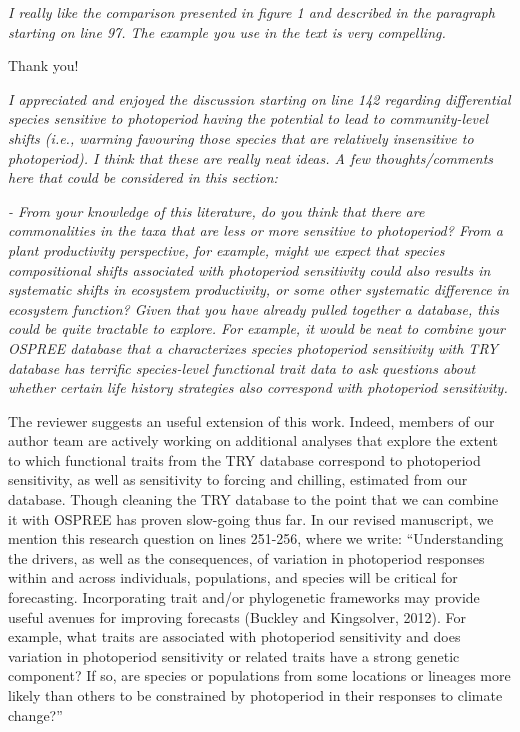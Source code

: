\documentclass{article}
\begin{document}
\par \emph{I really like the comparison presented in figure 1 and described in the paragraph starting on line 97. The example you use in the text is very compelling. }
\par Thank you!
\par \emph{I appreciated and enjoyed the discussion starting on line 142 regarding differential species sensitive to photoperiod having the potential to lead to community-level shifts (i.e., warming favouring those species that are relatively insensitive to photoperiod). I think that these are really neat ideas. A few thoughts/comments here that could be considered in this section: }
\par \emph{- From your knowledge of this literature, do you think that there are commonalities in the taxa that are less or more sensitive to photoperiod? From a plant productivity perspective, for example, might we expect that species compositional shifts associated with photoperiod sensitivity could also results in systematic shifts in ecosystem productivity, or some other systematic difference in ecosystem function? Given that you have already pulled together a database, this could be quite tractable to explore. For example, it would be neat to combine your OSPREE database that a characterizes species photoperiod sensitivity with TRY database has terrific species-level functional trait data to ask questions about whether certain life history strategies also correspond with photoperiod sensitivity. }
\par The reviewer suggests an useful extension of this work. Indeed, members of our author team are actively working on additional analyses that explore the extent to which functional traits from the TRY database correspond to photoperiod sensitivity, as well as sensitivity to forcing and chilling, estimated from our database. Though cleaning the TRY database to the point that we can combine it with OSPREE has proven slow-going thus far. In our revised manuscript, we mention this research question on lines 251-256, where we write:
``Understanding the drivers, as well as the consequences, of variation in photoperiod responses within and across  individuals, populations, and species will be critical for forecasting. Incorporating trait and/or phylogenetic frameworks may provide useful avenues for improving forecasts (Buckley and Kingsolver, 2012). For example, what traits are associated with photoperiod sensitivity and does variation in photoperiod sensitivity or related traits have a strong genetic component? If so, are species or populations from some locations or lineages more likely than others to be constrained by photoperiod in their responses to climate change?''
\end{document}

